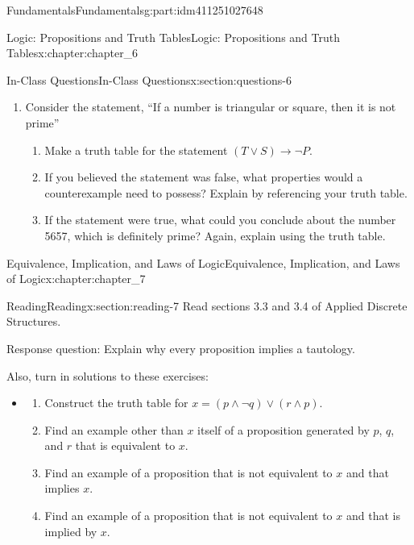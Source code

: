 \documentclass[oneside,10pt,]{book}
\numberwithin{equation}{section}
\begin{document}
\begin{partptx}{Fundamentals}{}{Fundamentals}{}{}{g:part:idm411251027648}
\begin{chapterptx}{Logic: Propositions and Truth Tables}{}{Logic: Propositions and Truth Tables}{}{}{x:chapter:chapter_6}
\begin{sectionptx}{In-Class Questions}{}{In-Class Questions}{}{}{x:section:questions-6}
\begin{enumerate}[label=\arabic*.]
\begin{enumerate}[label=(\alph*)]
\end{enumerate}
%
\item{}Consider the statement, ``If a number is triangular or square, then it is not prime''%
\begin{enumerate}[label=(\alph*)]
\item{}Make a truth table for the statement \((T \vee S) \rightarrow \neg P\).%
\item{}If you believed the statement was false, what properties would a counterexample need to possess? Explain by referencing your truth table.%
\item{}If the statement were true, what could you conclude about the number 5657, which is definitely prime? Again, explain using the truth table.%
\end{enumerate}
%
\end{enumerate}
%
\end{sectionptx}
\end{chapterptx}
%
\typeout{************************************************}
\typeout{************************************************}
%
\begin{chapterptx}{Equivalence, Implication, and Laws of Logic}{}{Equivalence, Implication, and Laws of Logic}{}{}{x:chapter:chapter_7}
%
%
%
%
%
\typeout{************************************************}
\typeout{************************************************}
%
\begin{sectionptx}{Reading}{}{Reading}{}{}{x:section:reading-7}
Read sections 3.3 and 3.4 of Applied Discrete Structures.%
\par
Response question: Explain why every proposition implies a tautology.%
\par
Also, turn in solutions to these exercises:%
\begin{itemize}[label=\textbullet]
\item{}%
\begin{enumerate}[label=(\alph*)]
\item{}Construct the truth table for \(x= (p \land  \neg q) \lor  (r \land  p)\).%
\item{}Find an example other than \(x\) itself of a proposition generated by \(p\), \(q\), and \(r\) that is equivalent to \(x\).%
\item{}Find an example of a proposition that is not equivalent to \(x\) and that implies \(x\).%
\item{}Find an example of a proposition that is not equivalent to \(x\) and that is implied by \(x\).%

\end{enumerate}
\end{itemize}
\end{sectionptx}
\end{chapterptx}
\end{partptx}
\end{document}
